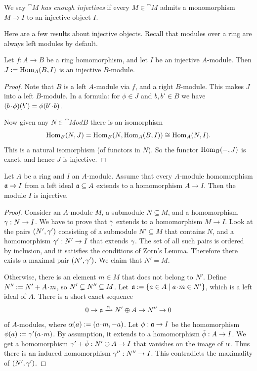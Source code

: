 \begin{dfn}
We say $\cat{M}$ {\em has enough injectives} if every $M \in \cat{M}$ admits
a monomorphism $M \to I$ to an injective object $I$. 
\end{dfn}

Here are a few results about injective objects. Recall that modules over a ring 
are always left modules by default. 

\begin{prop} \label{prop:1045}
Let $f : A \to B$ be a ring homomorphism, and let $I$ be an injective 
$A$-module. Then $J := \operatorname{Hom}_A(B, I)$ is an  injective $B$-module.
\end{prop}

\begin{proof}
Note that $B$ is a left $A$-module via $f$, and a right $B$-module. This makes
$J$ into a left $B$-module. In a formula: for $\phi \in J$ and $b, b' \in B$ we
have
$(b \mspace{1.5mu}{\cdot}\mspace{1.5mu} \phi)(b') = \phi(b' \mspace{1.5mu}{\cdot}\mspace{1.5mu} b)$. 

Now given any $N \in \cat{Mod} B$ there is an isomorphism 
\begin{equation} \label{eqn:4}
\operatorname{Hom}_B(N, J) =  \operatorname{Hom}_B(N, \operatorname{Hom}_A(B, I)) \cong 
\operatorname{Hom}_A(N, I) .
\end{equation}
 This is a natural isomorphism (of functors in $N$). So the functor 
$\operatorname{Hom}_B(-, J)$ is exact, and hence $J$ is injective. 
\end{proof}

\begin{thm} \label{thm:151}
Let $A$ be a ring and $I$ an $A$-module. Assume that 
every $A$-module homomorphism $\mathfrak{a} \to I$ from a left ideal $\mathfrak{a} \subseteq A$
extends to a homomorphism $A \to I$. Then the module $I$ is injective.
\end{thm}

\begin{proof}
Consider an $A$-module $M$, a submodule $N \subseteq M$, and a homomorphism 
$\gamma : N \to I$. We have to prove that $\gamma$ extends to a homomorphism 
$M \to I$. Look at the pairs $(N', \gamma')$ consisting of a submodule 
$N' \subseteq M$ that contains $N$, and a homomorphism 
$\gamma' : N' \to I$ that extends $\gamma$. The set of all such pairs is ordered by 
inclusion, and it satisfies the conditions of Zorn's Lemma. Therefore there 
exists a maximal pair $(N', \gamma')$. We claim that $N' = M$. 

Otherwise, there is an element $m \in M$ that does not belong to $N'$. 
Define $N'' := N' + A \mspace{1.5mu}{\cdot}\mspace{1.5mu} m$, so $N' \subsetneq N'' \subseteq M$. Let 
$\mathfrak{a} := \{ a \in A \mid a \mspace{1.5mu}{\cdot}\mspace{1.5mu} m \in N' \}$,
which is a left ideal of $A$. There is a short exact sequence 
\[ 0 \to \mathfrak{a} \xrightarrow{\alpha} N' \oplus A \to N'' \to 0 \]
of $A$-modules, where 
$\alpha(a) := (a \mspace{1.5mu}{\cdot}\mspace{1.5mu} m, -a)$. Let $\phi : \mathfrak{a} \to I$ be the homomorphism
$\phi(a) := \gamma'(a \mspace{1.5mu}{\cdot}\mspace{1.5mu} m)$. 
By assumption, it extends to a homomorphism 
$\tilde{\phi} : A \to I$. We get a homomorphism 
$\gamma' + \tilde{\phi}: N' \oplus A \to I$
that vanishes on the image of $\alpha$. 
Thus there is an induced homomorphism 
$\gamma'' : N'' \to I$. This contradicts the maximality of $(N', \gamma')$.
\end{proof}


